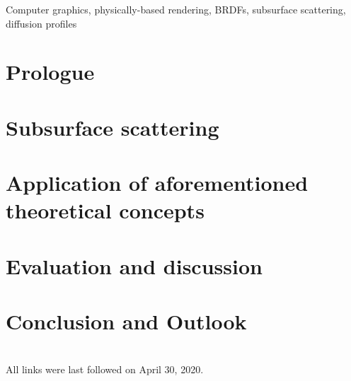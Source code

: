 \documentclass[english,runningheads,a4paper]{llncs}[2018/03/10]
\begin{document}
\begin{keywords}
  Computer graphics, physically-based rendering, BRDFs, subsurface scattering, diffusion profiles
\end{keywords}

\section{Prologue}
\label{sec:intro}

\section{Subsurface scattering}
\label{sec:intro}

\section{Application of aforementioned theoretical concepts}
\label{sec:application}

\section{Evaluation and discussion}
\label{sec:evalanddiscuss}

\section{Conclusion and Outlook}
\label{sec:outlook}

\nocite{*}

\renewcommand{\bibsection}{\section*{References}} %

\begingroup
  \ifluatex
  \else
  \fi
  \small %
  
\endgroup

\ \\
%
All links were last followed on April 30, 2020.
\end{document}
